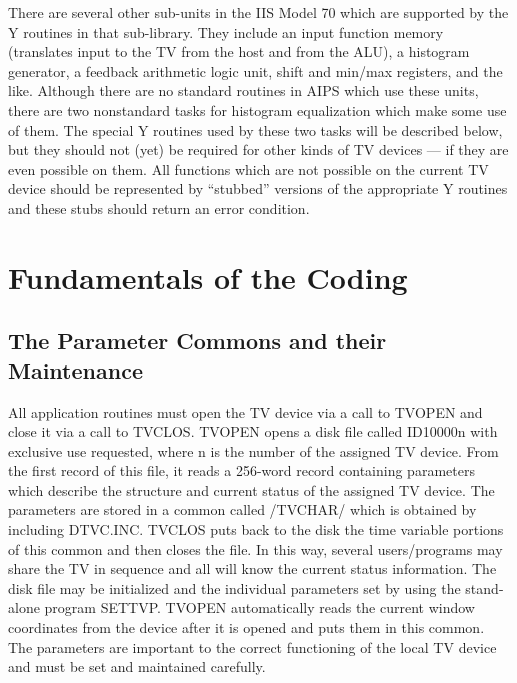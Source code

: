 There are several other sub-units in the IIS Model 70 which are
supported by the Y routines in that sub-library.  They include an
input function memory (translates input to the TV from the host and
from the ALU), a histogram generator, a feedback arithmetic logic
unit, shift and min/max registers, and the like.  Although there are
no standard routines in AIPS which use these units, there are two
nonstandard tasks for histogram equalization which make some use of
them.  The special Y routines used by these two tasks will be
described below, but they should not (yet) be required for other kinds
of TV devices --- if they are even possible on them.  All functions
which are not possible on the current TV device should be represented
by ``stubbed'' versions of the appropriate Y routines and these stubs
should return an error condition.

\section{Fundamentals of the Coding}

\subsection{The Parameter Commons and their Maintenance}
All application routines must open the TV device via a call to
TVOPEN and close it via a call to TVCLOS.  TVOPEN opens
a disk file called ID10000n with exclusive use requested, where n is
the number of the assigned TV device.  From the first record of this
file, it reads a 256-word record containing parameters which describe
the structure and current status of the assigned TV device.  The
parameters are stored in a common called /TVCHAR/ which is obtained by
including DTVC.INC.  TVCLOS puts back to the disk the
time variable portions of this common and then closes the file.  In
this way, several users/programs may share the TV in sequence and all
will know the current status information.  The disk file may be
initialized and the individual parameters set by using the stand-alone
program SETTVP.  TVOPEN automatically reads the current window
coordinates from the device after it is opened and puts them in this
common.  The parameters are important to the correct functioning of
the local TV device and must be set and maintained carefully.

